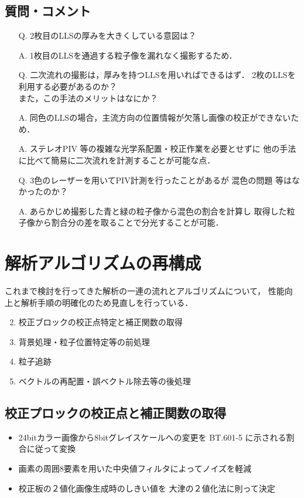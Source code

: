 \documentclass[twocolumn,a4j]{jsarticle}
\begin{document}
\subsection{質問・コメント}
\begin{itemize}
  \item [Q.]2枚目のLLSの厚みを大きくしている意図は？
  \item [A.] 1枚目のLLSを通過する粒子像を漏れなく撮影するため．\\
  \item [Q.]二次流れの撮影は，厚みを持つLLSを用いればできるはず．
        2枚のLLSを利用する必要があるのか？\\
        また，この手法のメリットはなにか？
  \item [A.] 同色のLLSの場合，主流方向の位置情報が欠落し画像の校正ができないため．
  \item [A.] ステレオPIV 等の複雑な光学系配置・校正作業を必要とせずに
        他の手法に比べて簡易に二次流れを計測することが可能な点．\\
  \item [Q.] 3色のレーザーを用いてPIV計測を行ったことがあるが
        混色の問題 等はなかったのか？
  \item [A.] あらかじめ撮影した青と緑の粒子像から混色の割合を計算し
        取得した粒子像から割合分の差を取ることで分光することが可能．
\end{itemize}

\newpage
\section{解析アルゴリズムの再構成}
これまで検討を行ってきた解析の一連の流れとアルゴリズムについて，
性能向上と解析手順の明確化のため見直しを行っている．

\begin{enumerate}[(1)]
  \item [] \textgt{[ 全体の流れ ]}
  \item 校正ブロックの校正点特定と補正関数の取得
  \item 背景処理・粒子位置特定等の前処理
  \item 粒子追跡
  \item ベクトルの再配置・誤ベクトル除去等の後処理
\end{enumerate}

\subsection{校正プロックの校正点と補正関数の取得}
\begin{itemize}
  \item 24bitカラー画像から8bitグレイスケールへの変更を
        BT.601-5 に示される割合に従って変換
  \item 画素の周囲8要素を用いた中央値フィルタによってノイズを軽減
  \item 校正板の２値化画像生成時のしきい値を
        大津の２値化法に則って決定
\end{itemize}
\end{document}
